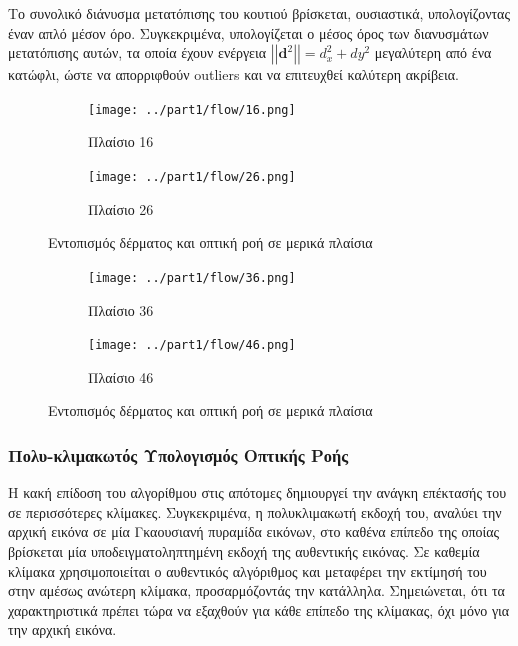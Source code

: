 \documentclass{article}
\newcommand{\eng}[1]{\foreignlanguage{english}{#1}}
\begin{document}
Το συνολικό διάνυσμα μετατόπισης του κουτιού βρίσκεται, ουσιαστικά, υπολογίζοντας έναν απλό μέσον όρο. Συγκεκριμένα, υπολογίζεται ο μέσος όρος των διανυσμάτων μετατόπισης αυτών, τα οποία έχουν ενέργεια $\left|\left| \pmb{d}^2 \right|\right| = d_x^2 + dy^2$ μεγαλύτερη από ένα κατώφλι, ώστε να απορριφθούν \eng{outliers} και να επιτευχθεί καλύτερη ακρίβεια.

\begin{figure}[h]
    \centering
    \begin{subfigure}[b]{0.49\textwidth}
        \centering{}
        \texttt{[image: ../part1/flow/16.png]}
        \caption{Πλαίσιο 16}
        \label{fig:}
    \end{subfigure}
    \hfill
    \begin{subfigure}[b]{0.49\textwidth}  
        \centering 
        \texttt{[image: ../part1/flow/26.png]}
        \caption{Πλαίσιο 26}
        \label{fig:}
    \end{subfigure}
    \caption{Εντοπισμός δέρματος και οπτική ροή σε μερικά πλαίσια}
    \label{fig:flows1}
\end{figure}
\begin{figure}[h]
    \begin{subfigure}[b]{0.49\textwidth}   
        \centering 
        \texttt{[image: ../part1/flow/36.png]}
        \caption{Πλαίσιο 36}
        \label{fig:}
    \end{subfigure}
    \hfill
    \begin{subfigure}[b]{0.49\textwidth}   
        \centering 
        \texttt{[image: ../part1/flow/46.png]}
        \caption{Πλαίσιο 46}
        \label{fig:}
    \end{subfigure}
    \caption{Εντοπισμός δέρματος και οπτική ροή σε μερικά πλαίσια}
    \label{fig:flows2}
\end{figure}


\clearpage
\subsubsection{Πολυ-κλιμακωτός Υπολογισμός Οπτικής Ροής}

Η κακή επίδοση του αλγορίθμου στις απότομες δημιουργεί την ανάγκη επέκτασής του σε περισσότερες κλίμακες. Συγκεκριμένα, η πολυκλιμακωτή εκδοχή του, αναλύει την αρχική εικόνα σε μία Γκαουσιανή πυραμίδα εικόνων, στο καθένα επίπεδο της οποίας βρίσκεται μία υποδειγματοληπτημένη εκδοχή της αυθεντικής εικόνας. Σε καθεμία κλίμακα χρησιμοποιείται ο αυθεντικός αλγόριθμος και μεταφέρει την εκτίμησή του στην αμέσως ανώτερη κλίμακα, προσαρμόζοντάς την κατάλληλα. Σημειώνεται, ότι τα χαρακτηριστικά πρέπει τώρα να εξαχθούν για κάθε επίπεδο της κλίμακας, όχι μόνο για την αρχική εικόνα. 
\end{document}
